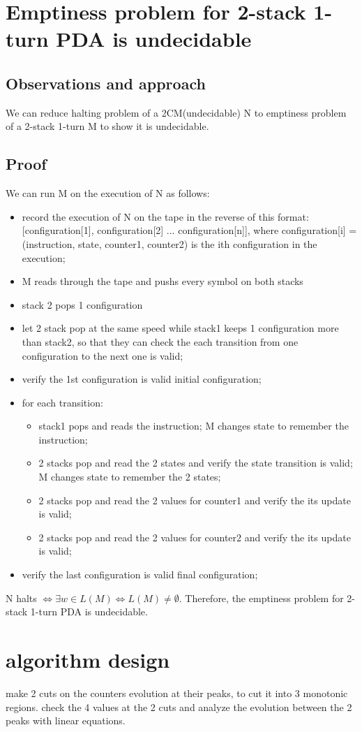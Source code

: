 \documentclass{article}
\begin{document}
\section{Emptiness problem for 2-stack 1-turn PDA is undecidable}

\subsection{Observations and approach}
We can reduce halting problem of a 2CM(undecidable) N to emptiness problem of a 2-stack 1-turn M to show it is undecidable.

\subsection{Proof}
We can run M on the execution of N as follows:
\begin{itemize}
	\item record the execution of N on the tape in the reverse of this format: [configuration[1], configuration[2] ... configuration[n]], where configuration[i] = (instruction, state, counter1, counter2) is the ith configuration in the execution;
	\item M reads through the tape and pushs every symbol on both stacks
	\item stack 2 pops 1 configuration
	\item let 2 stack pop at the same speed while stack1 keeps 1 configuration more than stack2, so that they can check the each transition from one configuration to the next one is valid;
	\item verify the 1st configuration is valid initial configuration;
	\item for each transition:
	\begin{itemize}
		\item stack1 pops and reads the instruction; M changes state to remember the instruction;
		\item 2 stacks pop and read the 2 states and verify the state transition is valid; M changes state to remember the 2 states;
		\item 2 stacks pop and read the 2 values for counter1 and verify the its update is valid;
		\item 2 stacks pop and read the 2 values for counter2 and verify the its update is valid;
	\end{itemize}
	\item verify the last configuration is valid final configuration;
\end{itemize}
N halts $ \iff \exists w \in L(M) \iff L(M) \neq \emptyset$. Therefore, the emptiness problem for 2-stack 1-turn PDA is undecidable.

\section{algorithm design}
make 2 cuts on the counters evolution at their peaks, to cut it into 3 monotonic regions. check the 4 values at the 2 cuts and analyze the evolution between the 2 peaks with linear equations.
\end{document}
